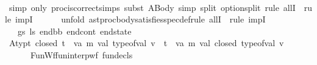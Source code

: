 \begin{isabellebody}
\ \ \isamarkupfalse%
{\isacharparenleft}{\kern0pt}\ {\isacharparenleft}{\kern0pt}simp\ only{\isacharcolon}{\kern0pt}\ proc{\isacharunderscore}{\kern0pt}is{\isacharunderscore}{\kern0pt}correct{\isachardot}{\kern0pt}simps{\isacharparenright}{\kern0pt}{\isacharcomma}{\kern0pt}\ subst\ ABody{\isacharcomma}{\kern0pt}\ simp\ split{\isacharcolon}{\kern0pt}\ option{\isachardot}{\kern0pt}split{\isacharcomma}{\kern0pt}\ {\isacharparenleft}{\kern0pt}rule\ allI\ {\isacharbar}{\kern0pt}\ rule\ impI{\isacharparenright}{\kern0pt}{\isacharplus}{\kern0pt}{\isacharcomma}{\kern0pt}\isanewline
\ \ \ \ \ \ unfold\ ast{\isacharunderscore}{\kern0pt}proc{\isacharunderscore}{\kern0pt}body{\isacharunderscore}{\kern0pt}satisfies{\isacharunderscore}{\kern0pt}spec{\isacharunderscore}{\kern0pt}def{\isacharcomma}{\kern0pt}{\isacharparenleft}{\kern0pt}rule\ allI\ {\isacharbar}{\kern0pt}\ rule\ impI{\isacharparenright}{\kern0pt}{\isacharplus}{\kern0pt}{\isacharparenright}{\kern0pt}\ \ \isanewline
\ \ \ \ \isamarkupfalse%
\ {\isasymGamma}\ {\isasymOmega}\ gs\ ls\ end{\isacharunderscore}{\kern0pt}bb\ end{\isacharunderscore}{\kern0pt}cont\ end{\isacharunderscore}{\kern0pt}state\isanewline
\ \ \ \ \isamarkupfalse%
\ Atyp{\isacharcolon}{\kern0pt}{\isachardoublequoteopen}{\isacharparenleft}{\kern0pt}{\isasymforall}t{\isachardot}{\kern0pt}\ closed\ t\ {\isasymlongrightarrow}\ {\isacharparenleft}{\kern0pt}{\isasymexists}v{\isacharcolon}{\kern0pt}{\isacharcolon}{\kern0pt}{\isacharparenleft}{\kern0pt}{\isacharprime}{\kern0pt}a{\isacharcomma}{\kern0pt}\ {\isacharprime}{\kern0pt}m{\isacharparenright}{\kern0pt}\ val{\isachardot}{\kern0pt}\ type{\isacharunderscore}{\kern0pt}of{\isacharunderscore}{\kern0pt}val\ v\ {\isacharequal}{\kern0pt}\ t{\isacharparenright}{\kern0pt}{\isacharparenright}{\kern0pt}\ {\isasymand}\ {\isacharparenleft}{\kern0pt}{\isasymforall}v{\isacharcolon}{\kern0pt}{\isacharcolon}{\kern0pt}{\isacharparenleft}{\kern0pt}{\isacharprime}{\kern0pt}a{\isacharcomma}{\kern0pt}\ {\isacharprime}{\kern0pt}m{\isacharparenright}{\kern0pt}\ val{\isachardot}{\kern0pt}\ closed\ {\isacharparenleft}{\kern0pt}type{\isacharunderscore}{\kern0pt}of{\isacharunderscore}{\kern0pt}val\ v{\isacharparenright}{\kern0pt}{\isacharparenright}{\kern0pt}{\isachardoublequoteclose}\ \isanewline
\ \ \ \ \ \ FunWf{\isacharcolon}{\kern0pt}{\isachardoublequoteopen}fun{\isacharunderscore}{\kern0pt}interp{\isacharunderscore}{\kern0pt}wf\ fun{\isacharunderscore}{\kern0pt}decls\ {\isasymGamma}{\isachardoublequoteclose}\ \isanewline

\end{isabellebody}
